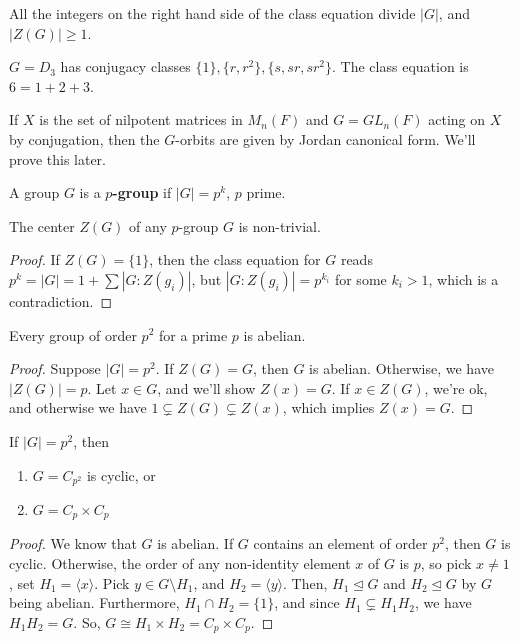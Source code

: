 \begin{rmk}
    All the integers on the right hand side of the class equation divide $|G|$, and $|Z(G)| \geq 1$.
\end{rmk}

\begin{ex}
    $G= D_3$ has conjugacy classes $\{1\},\{r,r^2\},\{s,sr,sr^2\}$. The class equation is $6 = 1+2+3$.
\end{ex}

\begin{ex}
    If $X$ is the set of nilpotent matrices in $M_n(F)$ and $G =GL_n(F)$ acting on $X$ by conjugation, then the $G$-orbits are given by Jordan canonical form. We'll prove this later.
\end{ex}

\begin{defn}
    A group $G$ is a \textbf{$p$-group} if $|G|=p^k$, $p$ prime.
\end{defn}

\begin{prop}
    The center $Z(G)$ of any $p$-group $G$ is non-trivial.
\end{prop}

\begin{proof}
    If $Z(G)=\{1\}$, then the class equation for $G$ reads $p^k=|G|=1+\sum |G:Z(g_i)|$, but $|G:Z(g_i)|=p^{k_i}$ for some $k_i>1$, which is a contradiction.
\end{proof}

\begin{cor}
    Every group of order $p^2$ for a prime $p$ is abelian.
\end{cor}

\begin{proof}
    Suppose $|G|=p^2$. If $Z(G)=G$, then $G$ is abelian. Otherwise, we have $|Z(G)|=p$. Let $x \in G$, and we'll show $Z(x)=G$. If $x \in Z(G)$, we're ok, and otherwise we have $1 \subsetneq Z(G) \subsetneq Z(x)$, which implies $Z(x)=G$.
\end{proof}

\begin{cor}
    If $|G|=p^2$, then
    \begin{enumerate}
        \item[(i)] $G=C_{p^2}$ is cyclic, or
        \item[(ii)] $G = C_p \times C_p$
    \end{enumerate}
\end{cor}

\begin{proof}
    We know that $G$ is abelian. If $G$ contains an element of order $p^2$, then $G$ is cyclic. Otherwise, the order of any non-identity element $x$ of $G$ is $p$, so pick $x \neq 1$, set $H_1 = \langle x \rangle$. Pick $y \in G \setminus H_1$, and $H_2 = \langle y \rangle$. Then, $H_1 \unlhd G$ and $H_2 \unlhd G$ by $G$ being abelian. Furthermore, $H_1 \cap H_2 = \{1\}$, and since $H_1 \subsetneq H_1H_2$, we have $H_1H_2=G$. So, $G \cong H_1 \times H_2=C_p \times C_p$.
\end{proof}

